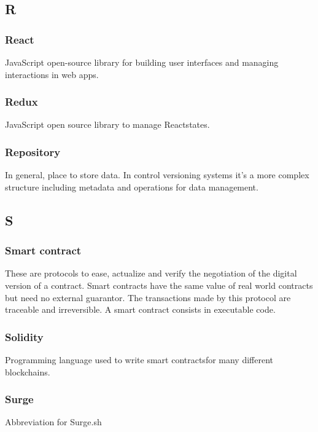 \subsection*{R}

\subsubsection*{React}
JavaScript open-source library for building user interfaces and managing interactions in web apps.

\subsubsection*{Redux}
JavaScript open source library to manage React\glosp states.

\subsubsection*{Repository}
In general, place to store data. In control versioning systems it's a more complex structure including metadata and operations for data management.


\subsection*{S}

\subsubsection*{Smart contract}
These are protocols to ease, actualize and verify the negotiation of the digital version of a contract. Smart contracts have the same value of real world contracts but need no external guarantor. The transactions made by this protocol are traceable and irreversible. A smart contract consists in executable code.

\subsubsection*{Solidity}
Programming language used to write smart contracts\glosp for many different blockchains\glo. 

\subsubsection*{Surge}
Abbreviation for Surge.sh

